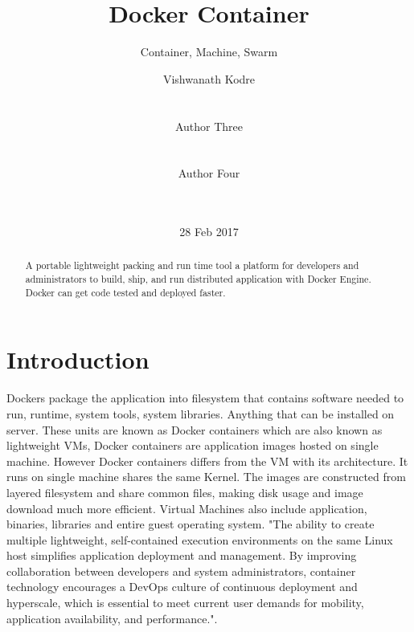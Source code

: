 \documentclass{acm_proc_article-sp}
\begin{document}
\title{Docker Container}
\subtitle{Container, Machine, Swarm}

\author{
\alignauthor
Vishwanath Kodre\\
       \\
       \\
\alignauthor
Author Three\\
       \\
       \\
\alignauthor
Author Four\\
       \\
       \\
}

\date{28 Feb 2017}


\maketitle
\begin{abstract}
A portable lightweight packing and run time tool a platform for developers and administrators to build, ship, and run distributed application with Docker Engine. Docker can get code tested and deployed faster. 
\end{abstract}


\section{Introduction}
Dockers package the application into filesystem that contains software needed to run, runtime, system tools, system libraries. Anything that can be installed on server. These units are known as Docker containers which are also known as lightweight VMs, Docker containers are application images hosted on single machine. However Docker containers differs from the VM with its architecture. It runs on single machine shares the same Kernel. The images are constructed from layered filesystem and share common files, making disk usage and image download much more efficient. Virtual Machines also include application, binaries, libraries and entire guest operating system. "The ability to create multiple lightweight, self-contained execution environments on the same Linux host simplifies application deployment and management. By improving collaboration between developers and system administrators, container technology encourages a DevOps culture of continuous deployment and hyperscale, which is essential to meet current user demands for mobility, application availability, and performance."\cite{DockerandtheLinuxcontainerecosystem}.
\end{document}
